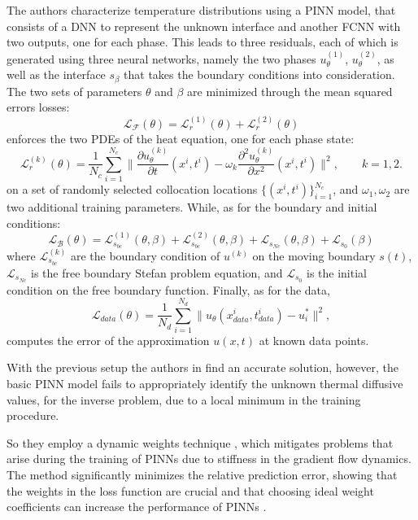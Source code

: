 \documentclass[pdflatex,sn-basic]{sn-jnl}%
\theoremstyle{thmstyleone}%
\theoremstyle{thmstyletwo}%
\theoremstyle{thmstylethree}%
\begin{document}
The authors characterize temperature distributions using a PINN model, that consists of a DNN to represent the unknown interface and another FCNN with two outputs, one for each phase. This leads to three residuals, each of which is generated using three neural networks, namely the two phases $u_{\theta}^{(1)}$, $u_{\theta}^{(2)}$, as well as the interface $s_{\beta}$ that takes the boundary conditions into consideration. 
The two sets of parameters $\theta$ and $\beta$ are minimized through the mean squared errors losses:
\begin{equation*}
\mathcal{L}_\mathcal{F}(\theta) =  \mathcal{L}_r^{(1)}(\theta) +  \mathcal{L}_r^{(2)}(\theta) 
\end{equation*}
enforces the two PDEs of the heat equation, one for each phase state:
\begin{equation*}
\mathcal{L}_r^{(k)}(\theta) =  \frac{1}{N_c} \sum_{i=1}^{N_c} \|
\frac{\partial u_{\theta}^{(k)}  }{\partial t} (x^i,t^i)
- \omega_k \frac{\partial^2 u_{\theta}^{(k)}}{\partial x^2}  (x^i,t^i)
\|^2, \qquad k=1,2.
\end{equation*}
on a set of randomly selected collocation locations $\{ (x^i,t^i)\}_{i=1}^{N_c}$,  and $\omega_1, \omega_2$ are two additional training parameters.
While, as for the boundary and initial conditions:
\begin{equation*}
\mathcal{L}_\mathcal{B}(\theta)  = 
\mathcal{L}_{s_{bc}}^{(1)}(\theta,\beta) +  \mathcal{L}_{s_{bc}}^{(2)}(\theta,\beta)+
\mathcal{L}_{s_{Nc}}(\theta,\beta) +  \mathcal{L}_{s_{0}}(\beta)
\end{equation*}
where $\mathcal{L}_{s_{bc}}^{(k)}$ are the boundary condition of $u^{(k)}$ on the moving boundary $s(t)$, $\mathcal{L}_{s_{Nc}}$ is the free boundary Stefan problem equation, and $\mathcal{L}_{s_{0}}$ is the initial condition on the free boundary function.
Finally, as for the data,
\begin{equation*}
\mathcal{L}_{data}(\theta)  = 
\frac{1}{N_d}\sum\limits_{i=1}^{N_d}
\|u_{\theta}(x^i_{data}, t^i_{data}) - u_i^*\|^2 ,
\end{equation*}
computes the error of the approximation $u(x,t)$ at known data points.

With the previous setup the authors in \cite{Cai2021_PhysicsInformedNeural_WanCWW} find an accurate solution, however, the basic PINN model fails to appropriately identify the unknown thermal diffusive values, for the inverse problem,  due to a local minimum in the training procedure.

So they employ a dynamic weights technique \citep{Wan2021_UnderstandingMitigatingGradient_TenWTP}, which mitigates problems that arise during the training of PINNs due to stiffness in the gradient flow dynamics.
%
The method significantly minimizes the relative prediction error, showing that the weights in the loss function are crucial and that choosing ideal weight coefficients can increase the performance of PINNs \citep{Cai2021_PhysicsInformedNeural_WanCWW}.
\end{document}
